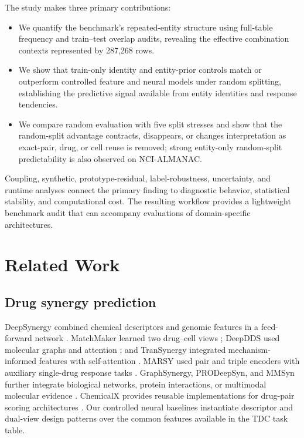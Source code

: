 \documentclass[conference]{IEEEtran}
\begin{document}
The study makes three primary contributions:
\begin{itemize}
    \item We quantify the benchmark's repeated-entity structure using full-table frequency and train--test overlap audits, revealing the effective combination contexts represented by 287,268 rows.
    \item We show that train-only identity and entity-prior controls match or outperform controlled feature and neural models under random splitting, establishing the predictive signal available from entity identities and response tendencies.
    \item We compare random evaluation with five split stresses and show that the random-split advantage contracts, disappears, or changes interpretation as exact-pair, drug, or cell reuse is removed; strong entity-only random-split predictability is also observed on NCI-ALMANAC.
\end{itemize}

Coupling, synthetic, prototype-residual, label-robustness, uncertainty, and runtime analyses connect the primary finding to diagnostic behavior, statistical stability, and computational cost. The resulting workflow provides a lightweight benchmark audit that can accompany evaluations of domain-specific architectures.

\section{Related Work}

\subsection{Drug synergy prediction}

DeepSynergy combined chemical descriptors and genomic features in a feed-forward network \cite{deepsynergy2018}. MatchMaker learned two drug--cell views \cite{matchmaker2022}; DeepDDS used molecular graphs and attention \cite{deepdds2022}; and TranSynergy integrated mechanism-informed features with self-attention \cite{transynergy2021}. MARSY used pair and triple encoders with auxiliary single-drug response tasks \cite{marsy2023}. GraphSynergy, PRODeepSyn, and MMSyn further integrate biological networks, protein interactions, or multimodal molecular evidence \cite{graphsynergy2021,prodeepsyn2022,mmsyn2024}. ChemicalX provides reusable implementations for drug-pair scoring architectures \cite{chemicalx2022}. Our controlled neural baselines instantiate descriptor and dual-view design patterns over the common features available in the TDC task table.
\end{document}
